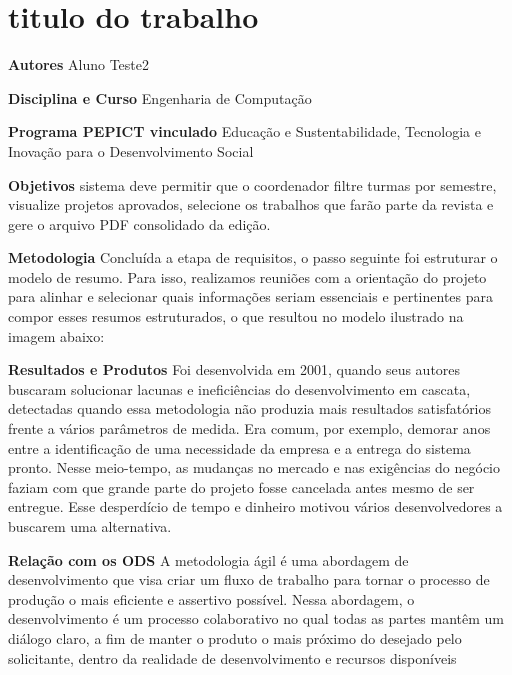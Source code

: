 \documentclass[12pt,openright,oneside,a4paper]{report}
\begin{document}
\vspace{0.7cm}
\newpage
\section{titulo do trabalho}
\noindent
\textbf{Autores}
Aluno Teste2

\vspace{0.7cm}
\noindent
\textbf{Disciplina e Curso}
Engenharia de Computação

\vspace{0.7cm}
\noindent
\textbf{Programa PEPICT vinculado}
Educação e Sustentabilidade, Tecnologia e Inovação para o Desenvolvimento Social

\vspace{0.7cm}
\noindent
\textbf{Objetivos}
sistema deve permitir que o coordenador filtre turmas por semestre, visualize projetos aprovados, selecione os trabalhos que farão parte da revista e gere o arquivo PDF consolidado da edição.

\vspace{0.7cm}
\noindent
\textbf{Metodologia}
Concluída a etapa de requisitos, o passo seguinte foi estruturar o modelo de resumo. Para isso, realizamos reuniões com a orientação do projeto para alinhar e selecionar quais informações seriam essenciais e pertinentes para compor esses resumos estruturados, o que resultou no modelo ilustrado na imagem abaixo:

\vspace{0.7cm}
\noindent
\textbf{Resultados e Produtos}
Foi desenvolvida em 2001, quando seus autores buscaram solucionar lacunas e ineficiências do desenvolvimento em cascata, detectadas quando essa metodologia não produzia mais resultados satisfatórios frente a vários parâmetros de medida. Era comum, por exemplo,  demorar anos entre a identificação de uma necessidade da empresa e a entrega do sistema pronto. Nesse meio-tempo, as mudanças no mercado e nas exigências do negócio faziam com que grande parte do projeto fosse cancelada antes mesmo de ser entregue. Esse desperdício de tempo e dinheiro motivou vários desenvolvedores a buscarem uma alternativa.

\vspace{0.7cm}
\noindent
\textbf{Relação com os ODS}
A metodologia ágil é uma abordagem de desenvolvimento que visa criar um fluxo de trabalho para tornar o processo de produção o mais eficiente e assertivo possível. Nessa abordagem, o desenvolvimento é um processo colaborativo no qual todas as partes mantêm um diálogo claro, a fim de manter o produto o mais próximo do desejado pelo solicitante, dentro da realidade de desenvolvimento e recursos disponíveis
\end{document}
